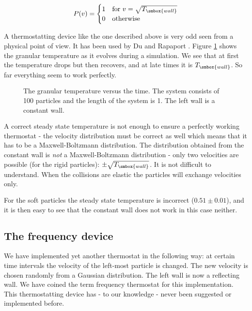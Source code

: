\begin{equation}
  P(v) = 
  \begin{cases}
    1    & \text{for $v = \sqrt{T_{\smbox{wall}}}$} \\
    0    & \text{otherwise}
  \end{cases}
\end{equation}

A thermostatting device like the one described above is very odd seen
from a physical point of view. It has been used by Du \etal \cite{Du95}
and Rapaport \cite{Rapaport92a}. Figure
\ref{fig:ConstWall} shows the granular temperature as it evolves during
a simulation. We see that at first the temperature drops but then recovers,
and at late times it is $T_{\smbox{wall}}$. So far everything
seem to work perfectly. 

\begin{figure}
  \begin{center}
  \end{center}
  \caption[The constant wall]{The granular temperature versus the time.
    The system consists of 100 particles and the length of the system is
    1. The left wall is a constant wall.\label{fig:ConstWall}} 
\end{figure}

A correct steady state temperature is not enough to ensure a perfectly
working thermostat - the velocity distribution must be correct as well
which means that it has to be a Maxwell-Boltzmann distribution. The
distribution obtained from the constant wall is \textit{not} a
Maxwell-Boltzmann distribution - only two velocities are possible (for
the rigid particles): $\pm \sqrt{T_{\smbox{wall}}}$. It is not
difficult to understand. When the collisions are elastic
the particles will exchange velocities only. 

For the soft particles the steady state temperature is
incorrect ($0.51 \pm 0.01$), and it is then easy to see that the
constant wall does not work in this case neither.

\subsection{The frequency device}
\label{sect:Freq}
We have implemented yet another thermostat in the following way: at
certain time intervals the velocity of the left-most particle is
changed. The new velocity is chosen randomly from a Gaussian
distribution. The left wall is now a reflecting wall. We have coined
the term frequency thermostat for this implementation. This
thermostatting device has - to our knowledge - never been suggested or
implemented before. 

